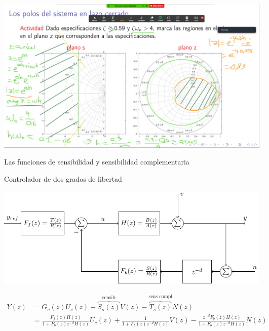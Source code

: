 \documentclass[presentation,aspectratio=169]{beamer}
\begin{document}
\begin{frame}[label={sec:orgad9de96}]{}
\begin{center}
\includegraphics[height=0.9\textheight]{../../figures/screenshot-2020-07-14.png}
\end{center}
\end{frame}

\begin{frame}[label={sec:org35ce93b}]{Las funciones de sensibilidad y sensibilidad complementaria}
\end{frame}
\begin{frame}[label={sec:orgb050e8c}]{Controlador de dos grados de libertad}
\begin{center}
\includegraphics[width=0.8\linewidth]{../../figures/2dof-block-explicit}
\end{center}

\begin{align*}
Y(z) &= G_c(z)U_c(z) + \overbrace{S_s(z)}^{\text{sensib}}V(z) - \overbrace{T_s(z)}^{\text{sens compl}}N(z)\\
     &= \frac{F_f(z)H(z)}{1 + F_b(z)z^{-d}H(z)}U_c(z) + \frac{1}{1 + F_b(z)z^{-d}H(z)}V(z)  - \frac{z^{-d}F_b(z)H(z)}{1 + F_b(z)z^{-d}H(z)}N(z)\\
\end{align*}
\end{frame}
\end{document}
